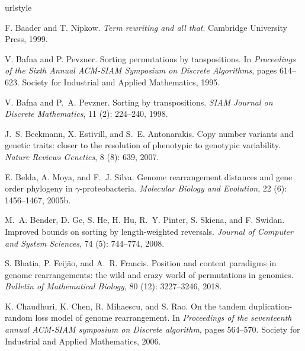 \documentclass[utf8]{Frontiers_LaTex_Templates/frontiersFPHY} %
\numberwithin{equation}{section}
\begin{document}
\begin{thebibliography}{38}
\providecommand{\natexlab}[1]{#1}
\providecommand{\url}[1]{\texttt{#1}}
\expandafter\ifx\csname urlstyle\endcsname\relax
  \providecommand{\doi}[1]{doi: #1}\else
  \providecommand{\doi}{doi: \begingroup \urlstyle{rm}\Url}\fi

F. Baader and T. Nipkow.
\newblock \emph{Term rewriting and all that}.
\newblock Cambridge University Press, 1999.

V. Bafna and P. Pevzner.
\newblock Sorting permutations by tanspositions.
\newblock In \emph{Proceedings of the Sixth Annual ACM-SIAM Symposium on
  Discrete Algorithms}, pages 614--623. Society for Industrial and Applied
  Mathematics, 1995.

V. Bafna and P.~A. Pevzner.
\newblock Sorting by transpositions.
\newblock \emph{SIAM Journal on Discrete Mathematics}, 11
  (2): 224--240, 1998.

J.~S. Beckmann, X. Estivill, and S.~E. Antonarakis.
\newblock Copy number variants and genetic traits: closer to the resolution of
  phenotypic to genotypic variability.
\newblock \emph{Nature Reviews Genetics}, 8 (8): 639, 2007.

\bibitem[Belda et~al.(2005{\natexlab{b}})]{belda2005genome}
E. Belda, A. Moya, and F.~J. Silva.
\newblock Genome rearrangement distances and gene order phylogeny in
  $\gamma$-proteobacteria.
\newblock \emph{Molecular Biology and Evolution}, 22 (6):
  1456--1467, 2005{\natexlab{b}}.

M.~A. Bender, D. Ge, S. He, H. Hu, R.~Y. Pinter, S.
  Skiena, and F. Swidan.
\newblock Improved bounds on sorting by length-weighted reversals.
\newblock \emph{Journal of Computer and System Sciences}, 74
  (5): 744--774, 2008.

S. Bhatia, P. Feij{\~a}o, and A.~R. Francis.
\newblock Position and content paradigms in genome rearrangements: the wild and
  crazy world of permutations in genomics.
\newblock \emph{Bulletin of Mathematical Biology}, 80 (12):
  3227--3246, 2018.

K. Chaudhuri, K. Chen, R. Mihaescu, and S. Rao.
\newblock On the tandem duplication-random loss model of genome rearrangement.
\newblock In \emph{Proceedings of the seventeenth annual ACM-SIAM symposium on
  Discrete algorithm}, pages 564--570. Society for Industrial and Applied
  Mathematics, 2006.


\end{thebibliography}
\end{document}
